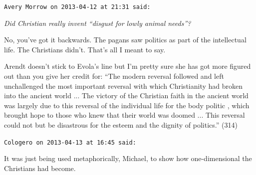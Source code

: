 \begin{footnotesize}
\begin{sffamily}
\hfill

\texttt{Avery Morrow on 2013-04-12 at 21:31 said:}

\emph{Did Christian really invent ``disgust for lowly animal needs''?}

No, you've got it backwards. The pagans saw politics as part of the intellectual life. The Christians didn't. That's all I meant to say.

Arendt doesn't stick to Evola's line but I'm pretty sure she has got more figured out than you give her credit for: ``The modern reversal followed and left unchallenged the most important reversal with which Christianity had broken into the ancient world ... The victory of the Christian faith in the ancient world was largely due to this reversal of the individual life for the body politic , which brought hope to those who knew that their world was doomed ... This reversal could not but be disastrous for the esteem and the dignity of politics.'' (314)

\hfill

\texttt{Cologero on 2013-04-13 at 16:45 said:}

It was just being used metaphorically, Michael, to show how one-dimensional the Christians had become.

\hfill

\end{sffamily}
\end{footnotesize}

